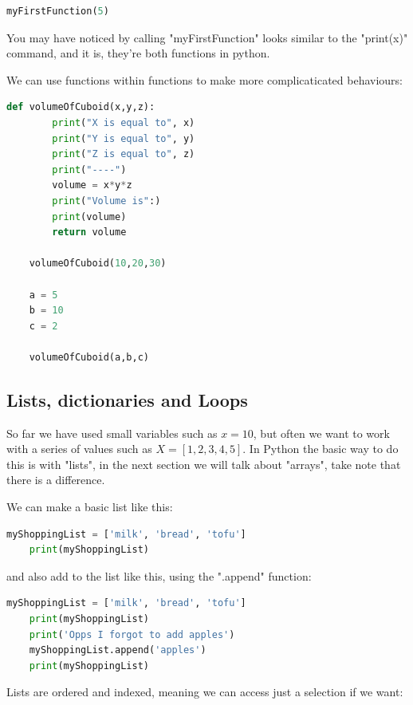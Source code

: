 \documentclass[12pt]{article}
\begin{document}
\begin{lstlisting}[language=Python]
myFirstFunction(5)
\end{lstlisting}

You may have noticed by calling "myFirstFunction" looks similar to the "print(x)" command, and it is, they're both functions in python. 

We can use functions within functions to make more complicaticated behaviours: 

\begin{lstlisting}[language=Python]
    def volumeOfCuboid(x,y,z):
        print("X is equal to", x)
        print("Y is equal to", y)
        print("Z is equal to", z)
        print("----")
        volume = x*y*z
        print("Volume is":)
        print(volume)
        return volume

    volumeOfCuboid(10,20,30)
    
    a = 5
    b = 10
    c = 2

    volumeOfCuboid(a,b,c)
\end{lstlisting}
    
\subsection{Lists, dictionaries and Loops}

So far we have used small variables such as $x=10$, but often we want to work with a series of values such as $X = [1,2,3,4,5]$. In Python the basic way to do this is with "lists", in the next section we will talk about "arrays", take note that there is a difference. 

We can make a basic list like this:

\begin{lstlisting}[language=Python]
    myShoppingList = ['milk', 'bread', 'tofu']
    print(myShoppingList)

\end{lstlisting}

and also add to the list like this, using the ".append" function:

\begin{lstlisting}[language=Python]
    myShoppingList = ['milk', 'bread', 'tofu']
    print(myShoppingList)
    print('Opps I forgot to add apples')
    myShoppingList.append('apples')
    print(myShoppingList)
\end{lstlisting}

Lists are ordered and indexed, meaning we can access just a selection if we want:
\end{document}
